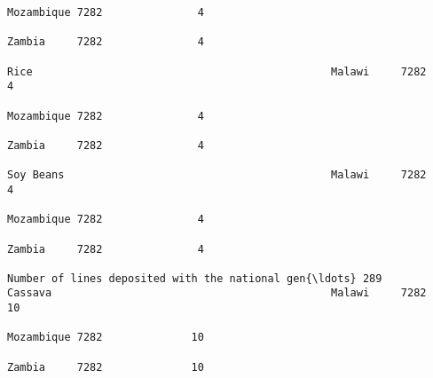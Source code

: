 \documentclass[11pt]{article}
\begin{document}
\begin{Verbatim}[commandchars=\\\{\}]
                                                                                                                                                                                                                 Mozambique 7282               4  
                                                                                                                                                                                                                 Zambia     7282               4  
                                                                                                                                                              Rice                                               Malawi     7282               4  
                                                                                                                                                                                                                 Mozambique 7282               4  
                                                                                                                                                                                                                 Zambia     7282               4  
                                                                                                                                                              Soy Beans                                          Malawi     7282               4  
                                                                                                                                                                                                                 Mozambique 7282               4  
                                                                                                                                                                                                                 Zambia     7282               4  
                                                                         Number of lines deposited with the national gen{\ldots} 289                               Cassava                                            Malawi     7282              10  
                                                                                                                                                                                                                 Mozambique 7282              10  
                                                                                                                                                                                                                 Zambia     7282              10  

\end{Verbatim}
\end{document}
